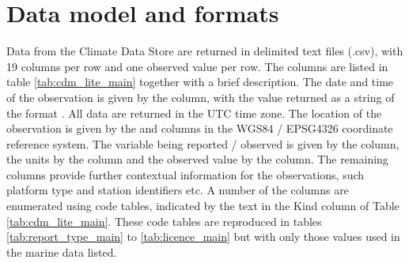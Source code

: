 \section{Data model and formats} \label{data_model}
Data from the Climate Data Store are returned in delimited text files (.csv), with 19 columns per row and one observed value per row. 
The columns are listed in table \ref{tab:cdm_lite_main} together with a brief description.  
The date and time of the observation is given by the  column, with the value returned as a string of the format . 
All data are returned in the UTC time zone.
The location of the observation is given by the  and  columns in the WGS84 / EPSG4326 coordinate reference system. 
The variable being reported / observed is given by the  column, the units by the  column and the observed value by the  column. 
The remaining columns provide further contextual information for the observations, such platform type and station identifiers etc. 
A number of the columns are enumerated using code tables, indicated by the text  in the Kind column of Table \ref{tab:cdm_lite_main}.
These code tables are reproduced in tables \ref{tab:report_type_main} to \ref{tab:licence_main} but with only those values used in the marine data listed.

